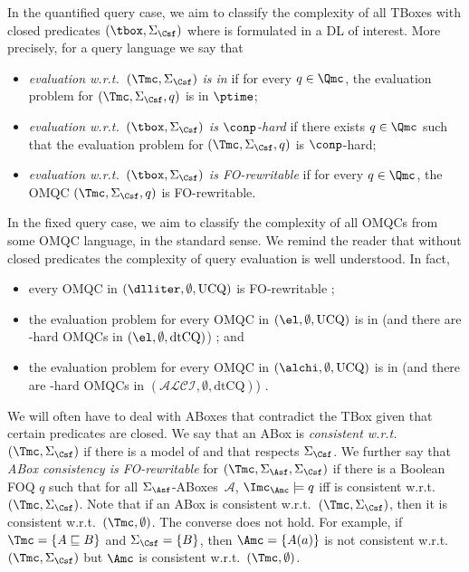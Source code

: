 \documentclass{lmcs}
\theoremstyle{definition}
\begin{document}
In the quantified query case, we aim to classify the complexity of all
TBoxes with closed predicates $(\tbox,\Sigma_{\Csf})$ where \tbox is
formulated in a DL of interest.  More precisely, for a query language
\Qmc we say that
  \begin{itemize}
  \item 
    \emph{\Qmc evaluation w.r.t.~$(\Tmc,\Sigma_\Csf)$ is in \ptime} if 
    for every $q\in\Qmc$, the evaluation problem for 
    $(\Tmc,\Sigma_\Csf,q)$ is in $\ptime$;
  \item 
    \emph{\Qmc evaluation w.r.t.~$(\tbox,\Sigma_{\Csf})$ is $\conp$-hard} 
    if there exists $q\in\Qmc$ such that the evaluation problem 
    for $(\Tmc,\Sigma_\Csf,q)$ is 
    $\conp$-hard;
  \item \emph{\Qmc evaluation w.r.t.~$(\tbox,\Sigma_\Csf)$ is FO-rewritable} 
    if for every $q\in \Qmc$, the OMQC $(\Tmc,\Sigma_\Csf,q)$ is FO-rewritable. 
 \end{itemize}
%
In the fixed query case, we aim to classify the complexity of all
OMQCs from some OMQC language, in the standard sense. We remind the
reader that without closed predicates the complexity of query
evaluation is well understood. In fact,
%
\begin{itemize}
\item every OMQC in $(\dlliter,\emptyset,\text{UCQ})$ is FO-rewritable \cite{CDLLR07}; 
\item the evaluation problem for every OMQC in $(\el,\emptyset,\text{UCQ})$ is in \PTime (and there are \PTime-hard OMQCs in
$(\el,\emptyset,\text{dtCQ})$) \cite{DBLP:conf/kr/CalvaneseGLLR06,DBLP:conf/lpar/KrisnadhiL07}; and
\item the evaluation problem for every OMQC in $(\alchi,\emptyset,\text{UCQ})$ is in \conp (and there are \conp-hard OMQCs in
$(\mathcal{ALCI},\emptyset,\text{dtCQ})$) \cite{hustadt2005data,ortiz2008data,Schaerf-93,DBLP:conf/kr/CalvaneseGLLR06}.
\end{itemize}
%
We will often have to deal with ABoxes that contradict the TBox given
that certain predicates are closed. We say that an ABox \Amc is
\emph{consistent w.r.t.~$(\Tmc,\Sigma_\Csf)$} if there is a model of
\Tmc and \Amc that respects $\Sigma_\Csf$.  We further say that
\emph{ABox consistency is FO-rewritable} for
$(\Tmc,\Sigma_{\Asf},\Sigma_\Csf)$ if there is a Boolean FOQ $q$ such
that for all $\Sigma_{\Asf}$-ABoxes~$\mathcal{A}$,
$\Imc_{\Amc} \models q$ iff \Amc is consistent w.r.t.\
$(\Tmc,\Sigma_\Csf)$. Note that if an ABox is consistent
w.r.t.~$(\Tmc,\Sigma_{\Csf})$, then it is consistent
w.r.t.~$(\Tmc,\emptyset)$. The converse does not hold. For example, if
$\Tmc=\{A \sqsubseteq B\}$ and $\Sigma_{\Csf}=\{B\}$, then
$\Amc=\{A(a)\}$ is not consistent w.r.t.~$(\Tmc,\Sigma_{\Csf})$ but
$\Amc$ is consistent w.r.t.~$(\Tmc,\emptyset)$.
\end{document}
